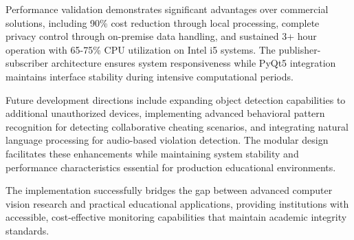 \documentclass[conference]{IEEEtran}
\begin{document}
Performance validation demonstrates significant advantages over commercial solutions, including 90\% cost reduction through local processing, complete privacy control through on-premise data handling, and sustained 3+ hour operation with 65-75\% CPU utilization on Intel i5 systems. The publisher-subscriber architecture ensures system responsiveness while PyQt5 integration maintains interface stability during intensive computational periods.

Future development directions include expanding object detection capabilities to additional unauthorized devices, implementing advanced behavioral pattern recognition for detecting collaborative cheating scenarios, and integrating natural language processing for audio-based violation detection. The modular design facilitates these enhancements while maintaining system stability and performance characteristics essential for production educational environments.

The implementation successfully bridges the gap between advanced computer vision research and practical educational applications, providing institutions with accessible, cost-effective monitoring capabilities that maintain academic integrity standards.
\end{document}
